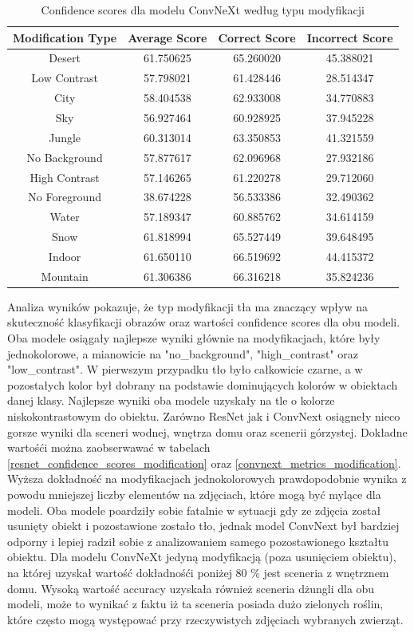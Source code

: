 \begin{table}
	\centering
	\begin{tabular}{|c|c|c|c|}
		\hline
		\textbf{Modification Type} & \textbf{Average Score} & \textbf{Correct Score} & \textbf{Incorrect Score} \\
		\hline
		Desert & 61.750625 & 65.260020 & 45.388021 \\
		\hline
		Low Contrast & 57.798021 & 61.428446 & 28.514347 \\
		\hline
		City & 58.404538 & 62.933008 & 34.770883 \\
		\hline
		Sky & 56.927464 & 60.928925 & 37.945228 \\
		\hline
		Jungle & 60.313014 & 63.350853 & 41.321559 \\
		\hline
		No Background & 57.877617 & 62.096968 & 27.932186 \\
		\hline
		High Contrast & 57.146265 & 61.220278 & 29.712060 \\
		\hline
		No Foreground & 38.674228 & 56.533386 & 32.490362 \\
		\hline
		Water & 57.189347 & 60.885762 & 34.614159 \\
		\hline
		Snow & 61.818994 & 65.527449 & 39.648495 \\
		\hline
		Indoor & 61.650110 & 66.519692 & 44.415372 \\
		\hline
		Mountain & 61.306386 & 66.316218 & 35.824236 \\
		\hline
	\end{tabular}
	\caption{Confidence scores dla modelu ConvNeXt według typu modyfikacji}
	\label{tab:convnext_confidence_scores_modification}
\end{table}

Analiza wyników pokazuje, że typ modyfikacji tła ma znaczący wpływ na skuteczność klasyfikacji obrazów oraz wartości confidence scores dla obu modeli. Oba modele osiągały najlepsze wyniki głównie na modyfikacjach, które były jednokolorowe, a mianowicie na "no\_background", "high\_contrast"
oraz "low\_contrast". W pierwszym przypadku tło było całkowicie czarne, a w pozostałych kolor był dobrany na podstawie dominujących kolorów w obiektach danej klasy. Najlepsze wyniki oba modele uzyskały na tle o kolorze niskokontrastowym do obiektu. Zarówno ResNet jak i ConvNext
osiągneły nieco gorsze wyniki dla sceneri wodnej, wnętrza domu oraz scenerii górzystej. Dokładne wartośći można zaobserwawać w tabelach \ref*{resnet_confidence_scores_modification} oraz \ref*{convnext_metrics_modification}. Wyższa dokładność na modyfikacjach jednokolorowych prawdopodobnie wynika z powodu mniejszej liczby elementów na 
zdjęciach, które mogą być mylące dla modeli. Oba modele poardziły sobie fatalnie w sytuacji gdy ze zdjęcia został usunięty obiekt i pozostawione zostało tło, jednak model ConvNext był bardziej odporny i lepiej radził sobie z analizowaniem samego pozostawionego kształtu obiektu. Dla modelu
ConvNeXt jedyną modyfikacją (poza usunięciem obiektu), na której uzyskał wartość dokładnośći poniżej 80 \% jest sceneria z wnętrznem domu. Wysoką wartość accuracy uzyskała również sceneria dżungli dla obu modeli, może to wynikać z faktu iż ta sceneria posiada dużo zielonych roślin,
które często mogą występować przy rzeczywistych zdjęciach wybranych zwierząt.

